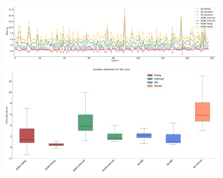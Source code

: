 \begin{figure}[htbp]
	\centering
	\begin{minipage}[b]{\textwidth}
		\centering
		\includegraphics[width=\textwidth]{./invariants/data/SUSSEX/prep1/images/spontaneous_2phases_time_cycle.pdf}
		\includegraphics[width=\textwidth,height=0.2\textheight]{./invariants/data/SUSSEX/prep1/images/spontaneous_2phases_boxplot_h.pdf}		
	\end{minipage}
	\centering
	\begin{minipage}{\textwidth}

\end{minipage}
\end{figure}
